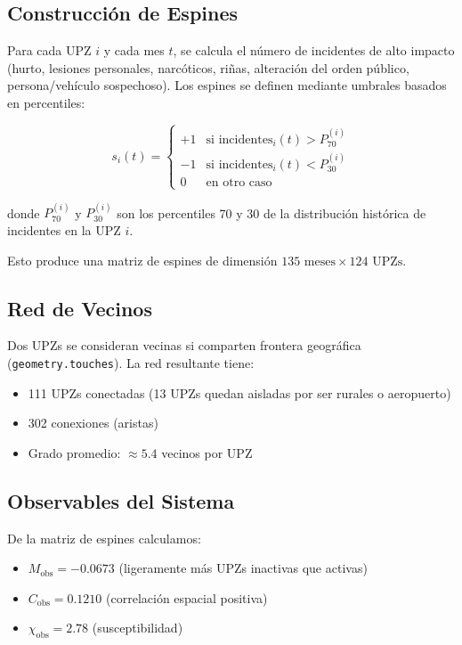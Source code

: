 \documentclass[12pt,a4paper]{article}
\begin{document}
\subsection{Construcción de Espines}

Para cada UPZ $i$ y cada mes $t$, se calcula el número de incidentes de alto impacto (hurto, lesiones personales, narcóticos, riñas, alteración del orden público, persona/vehículo sospechoso). Los espines se definen mediante umbrales basados en percentiles:

\begin{equation}\label{eq:espines}
s_i(t) = \begin{cases}
+1 & \text{si } \text{incidentes}_i(t) > P_{70}^{(i)} \\
-1 & \text{si } \text{incidentes}_i(t) < P_{30}^{(i)} \\
0  & \text{en otro caso}
\end{cases}
\end{equation}

donde $P_{70}^{(i)}$ y $P_{30}^{(i)}$ son los percentiles 70 y 30 de la distribución histórica de incidentes en la UPZ $i$.

Esto produce una matriz de espines de dimensión $135 \text{ meses} \times 124 \text{ UPZs}$.

\subsection{Red de Vecinos}

Dos UPZs se consideran vecinas si comparten frontera geográfica (\texttt{geometry.touches}). La red resultante tiene:
\begin{itemize}
    \item 111 UPZs conectadas (13 UPZs quedan aisladas por ser rurales o aeropuerto)
    \item 302 conexiones (aristas)
    \item Grado promedio: $\approx 5.4$ vecinos por UPZ
\end{itemize}

\subsection{Observables del Sistema}

De la matriz de espines calculamos:
\begin{itemize}
    \item $M_{\text{obs}} = -0.0673$ (ligeramente más UPZs inactivas que activas)
    \item $C_{\text{obs}} = 0.1210$ (correlación espacial positiva)
    \item $\chi_{\text{obs}} = 2.78$ (susceptibilidad)
\end{itemize}
\end{document}
